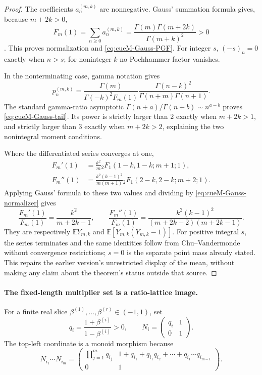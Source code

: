\begin{proof}
The coefficients $a_n^{(m,k)}$ are nonnegative.  Gauss' summation formula gives, because
$m+2k>0$,
\begin{equation}
 F_m(1)=\sum_{n\geq0}a_n^{(m,k)}
 =\frac{\Gamma(m)\Gamma(m+2k)}{\Gamma(m+k)^2}>0
 \label{eq:cueM-Gauss-normalizer}
\end{equation}
\cite[Gauss summation formula]{oldeDaalhuisDLMF15}.  This proves normalization and
\eqref{eq:cueM-Gauss-PGF}.  For integer $s$, $(-s)_n=0$ exactly when $n>s$; for noninteger
$k$ no Pochhammer factor vanishes.

In the nonterminating case, gamma notation gives
\[
 p_n^{(m,k)}=\frac{\Gamma(m)}{\Gamma(-k)^2F_m(1)}
 \frac{\Gamma(n-k)^2}{\Gamma(n+m)\Gamma(n+1)}.
\]
The standard gamma-ratio asymptotic
$\Gamma(n+a)/\Gamma(n+b)\sim n^{a-b}$ proves
\eqref{eq:cueM-Gauss-tail}.  Its power is strictly larger than $2$ exactly when
$m+2k>1$, and strictly larger than $3$ exactly when $m+2k>2$, explaining the two
nonintegral moment conditions.

Where the differentiated series converges at one,
\begin{align*}
 F_m'(1)&=\frac{k^2}{m}{}_2F_1(1-k,1-k;m+1;1),\\
 F_m''(1)&=\frac{k^2(k-1)^2}{m(m+1)}
 {}_2F_1(2-k,2-k;m+2;1).
\end{align*}
Applying Gauss' formula to these two values and dividing by
\eqref{eq:cueM-Gauss-normalizer} gives
\[
 \frac{F_m'(1)}{F_m(1)}=\frac{k^2}{m+2k-1},\qquad
 \frac{F_m''(1)}{F_m(1)}=
 \frac{k^2(k-1)^2}{(m+2k-2)(m+2k-1)}.
\]
They are respectively $\mathbb EY_{m,k}$ and
$\mathbb E[Y_{m,k}(Y_{m,k}-1)]$.  For positive integral $s$, the series terminates and the
same identities follow from Chu--Vandermonde without convergence restrictions; $s=0$ is the
separate point mass already stated.  This repairs the earlier version's unrestricted display
of the mean, without making any claim about the theorem's status outside that source.
\end{proof}

\paragraph{The fixed-length multiplier set is a ratio-lattice image.}
For a finite real slice $\beta^{(1)},\ldots,\beta^{(r)}\in(-1,1)$, set
\begin{equation}
 q_i=\frac{1+\beta^{(i)}}{1-\beta^{(i)}}>0,\qquad
 N_i=\begin{pmatrix}q_i&1\\0&1\end{pmatrix}.
 \label{eq:cueM-drift-matrices}
\end{equation}
The top-left coordinate is a monoid morphism because
\begin{equation}
 N_{i_1}\cdots N_{i_m}=
 \begin{pmatrix}
 \prod_{j=1}^{m}q_{i_j}&
 1+q_{i_1}+q_{i_1}q_{i_2}+\cdots+q_{i_1}\cdots q_{i_{m-1}}\\
 0&1
 \end{pmatrix}.
 \label{eq:cueM-drift-product}
\end{equation}

